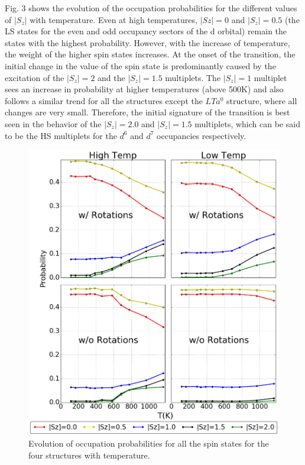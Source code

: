 \documentclass[10pt]{ruthesis}
\begin{document}
{Fig. 3 shows the evolution of the occupation probabilities for the different values of $|S_z|$ with temperature. Even at high temperatures, $|Sz|=0$ and $|S_z|=0.5$ (the LS states for the even and odd occupancy sectors of the d orbital) remain the states with the highest probability. However, with the increase of temperature, the weight of the higher spin states increases. 
%
 At the onset of the transition, the initial change in the value of the spin state is predominantly caused by the excitation of the $|S_z|=2$ and the $|S_z|=1.5$ multiplets.  
The $|S_z|=1$ multiplet sees an increase in probability at higher temperatures (above 500K) and also follows a similar trend for all the structures except the $LTa^0$ structure, where all changes are very small. Therefore, the initial signature of the transition is best seen in the behavior of the $|S_z|=2.0$ and $|S_z|=1.5$ multiplets, which can be said to be the HS multiplets for the $d^6$ and $d^7$ occupancies respectively. 
 \begin{figure}
 \begin{center}
 \includegraphics[width=\columnwidth]{./plots_final/output/New_Sz.png}
 \caption{Evolution of occupation probabilities for all the spin states for the four structures with temperature. }
 \end{center}
 \end{figure}


}
\end{document}
